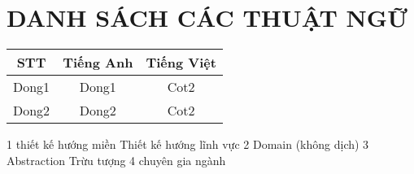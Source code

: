 \newpage
\section*{\centering DANH SÁCH CÁC THUẬT NGỮ}



\begin{table}[h]
\centering
\begin{tabular}{|c|c|c|}
\hline
STT & Tiếng Anh & Tiếng Việt \\
\hline
Dong1 & Dong1 & Cot2 \\
\hline
Dong2 & Dong2 & Cot2 \\
\hline
\end{tabular}
\end{table}

\newpage


1 thiết kế hướng miền
Thiết kế hướng lĩnh vực
2 Domain (không dịch)
3 Abstraction Trừu tượng
4 chuyên gia ngành